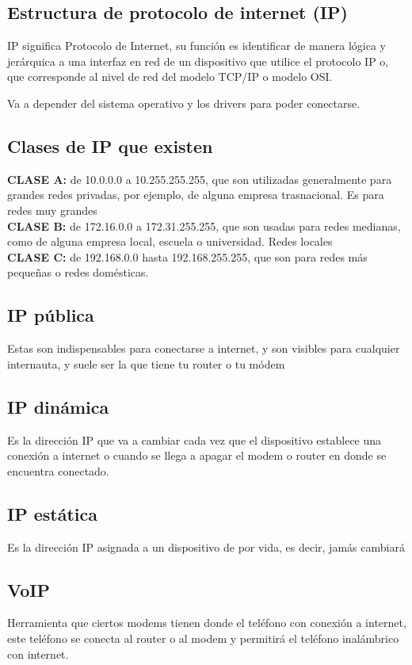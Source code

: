 \documentclass[letterpaper,12pt]{article}
\begin{document}
\begin{sloppypar}
\subsection{Estructura de protocolo de internet (IP)}
IP significa Protocolo de Internet, su función es identificar de manera lógica y jerárquica a una interfaz en red de un dispositivo que utilice el protocolo IP o, que corresponde al nivel de red del modelo TCP/IP o modelo OSI.

Va a depender del sistema operativo y los drivers para poder conectarse. 

\subsection{Clases de IP que existen}
\textbf{CLASE A:} de 10.0.0.0 a 10.255.255.255, que son utilizadas generalmente para grandes redes privadas, por ejemplo, de alguna empresa trasnacional. Es para redes muy grandes
\vspace{0.3cm}\\ 
\textbf{CLASE B:} de 172.16.0.0 a 172.31.255.255, que son usadas para redes medianas, como de alguna empresa local, escuela o universidad. Redes locales
\vspace{0.3cm}\\
\textbf{CLASE C: }de 192.168.0.0 hasta 192.168.255.255, que son para redes más pequeñas o redes domésticas.

\subsection{IP pública}
Estas son indispensables para conectarse a internet, y son visibles para cualquier internauta, y suele ser la que tiene tu router o tu módem 

\subsection{IP dinámica}
Es la dirección IP que va a cambiar cada vez que el dispositivo establece una conexión a internet o cuando se llega a apagar el modem o router en donde se encuentra conectado.

\subsection{IP estática}
Es la dirección IP asignada a un dispositivo de por vida, es decir, jamás cambiará

\subsection{VoIP}
Herramienta que ciertos modems tienen donde el teléfono con conexión a internet, este teléfono se conecta al router o al modem y permitirá el teléfono inalámbrico con internet.


\end{sloppypar}
\end{document}
